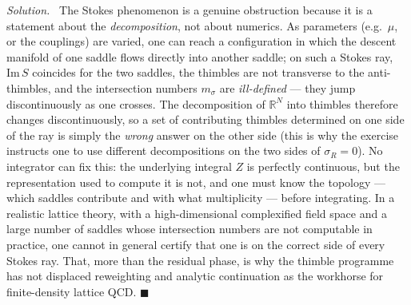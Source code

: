 \documentclass[11pt]{article}
\newenvironment{solution}{\par\smallskip\noindent\textit{Solution.}\ }{\hfill$\blacksquare$\par\smallskip}
\begin{document}
\begin{solution}
The Stokes phenomenon is a genuine obstruction because it is a statement about the \emph{decomposition}, not about numerics. As parameters (e.g.\ $\mu$, or the couplings) are varied, one can reach a configuration in which the descent manifold of one saddle flows directly into another saddle; on such a Stokes ray, $\mathrm{Im}\,S$ coincides for the two saddles, the thimbles are not transverse to the anti-thimbles, and the intersection numbers $m_\sigma$ are \emph{ill-defined} --- they jump discontinuously as one crosses. The decomposition of $\mathbb{R}^N$ into thimbles therefore changes discontinuously, so a set of contributing thimbles determined on one side of the ray is simply the \emph{wrong} answer on the other side (this is why the exercise instructs one to use different decompositions on the two sides of $\sigma_R = 0$). No integrator can fix this: the underlying integral $Z$ is perfectly continuous, but the representation used to compute it is not, and one must know the topology --- which saddles contribute and with what multiplicity --- before integrating. In a realistic lattice theory, with a high-dimensional complexified field space and a large number of saddles whose intersection numbers are not computable in practice, one cannot in general certify that one is on the correct side of every Stokes ray. That, more than the residual phase, is why the thimble programme has not displaced reweighting and analytic continuation as the workhorse for finite-density lattice QCD.
\end{solution}
\end{document}
